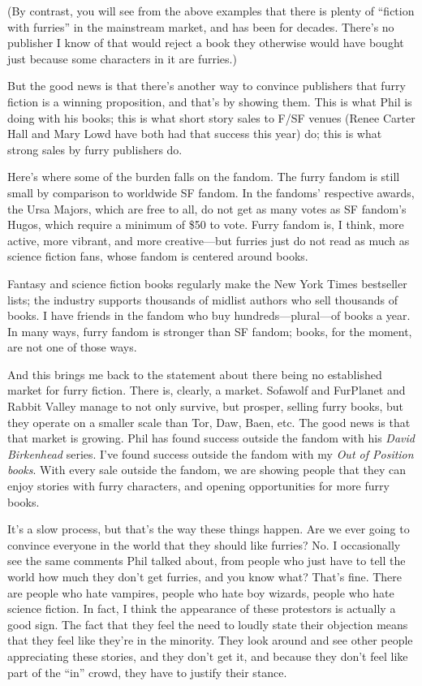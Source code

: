 (By contrast, you will see from the above examples that there is plenty of ``fiction with furries'' in the mainstream market, and has been for decades. There's no publisher I know of that would reject a book they otherwise would have bought just because some characters in it are furries.)

But the good news is that there's another way to convince publishers that furry fiction is a winning proposition, and that's by showing them. This is what Phil is doing with his books; this is what short story sales to F/SF venues (Renee Carter Hall and Mary Lowd have both had that success this year) do; this is what strong sales by furry publishers do.

Here's where some of the burden falls on the fandom. The furry fandom is still small by comparison to worldwide SF fandom. In the fandoms' respective awards, the Ursa Majors, which are free to all, do not get as many votes as SF fandom's Hugos, which require a minimum of \$50 to vote. Furry fandom is, I think, more active, more vibrant, and more creative—but furries just do not read as much as science fiction fans, whose fandom is centered around books.

Fantasy and science fiction books regularly make the New York Times bestseller lists; the industry supports thousands of midlist authors who sell thousands of books. I have friends in the fandom who buy hundreds—plural—of books a year. In many ways, furry fandom is stronger than SF fandom; books, for the moment, are not one of those ways.

And this brings me back to the statement about there being no established market for furry fiction. There is, clearly, a market. Sofawolf and FurPlanet and Rabbit Valley manage to not only survive, but prosper, selling furry books, but they operate on a smaller scale than Tor, Daw, Baen, etc. The good news is that that market is growing. Phil has found success outside the fandom with his \textit{David Birkenhead} series. I've found success outside the fandom with my \textit{Out of Position books}. With every sale outside the fandom, we are showing people that they can enjoy stories with furry characters, and opening opportunities for more furry books.

It's a slow process, but that's the way these things happen. Are we ever going to convince everyone in the world that they should like furries? No. I occasionally see the same comments Phil talked about, from people who just have to tell the world how much they don't get furries, and you know what? That's fine. There are people who hate vampires, people who hate boy wizards, people who hate science fiction. In fact, I think the appearance of these protestors is actually a good sign. The fact that they feel the need to loudly state their objection means that they feel like they're in the minority. They look around and see other people appreciating these stories, and they don't get it, and because they don't feel like part of the ``in'' crowd, they have to justify their stance.

